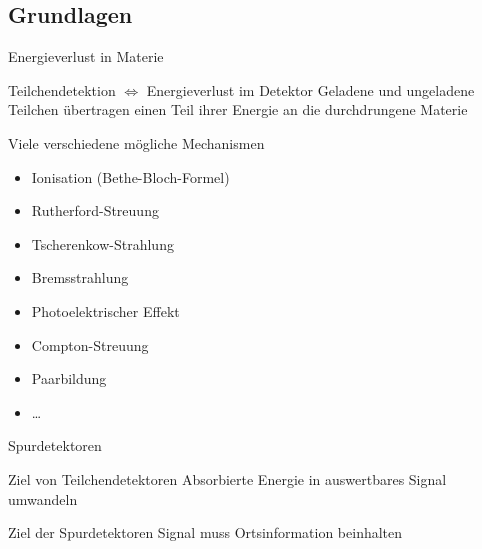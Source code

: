 
\subsection{Grundlagen}


\begin{frame}{Energieverlust in Materie}
	\begin{block}{Teilchendetektion $\Leftrightarrow$ Energieverlust im Detektor}
		Geladene und ungeladene Teilchen übertragen einen Teil ihrer Energie an die
		durchdrungene Materie	
	\end{block}
	
	
	\begin{block}{Viele verschiedene mögliche Mechanismen}
		\begin{itemize}
		  \item Ionisation (Bethe-Bloch-Formel)
		  \item Rutherford-Streuung
		  \item Tscherenkow-Strahlung
		  \item Bremsstrahlung
		  \item Photoelektrischer Effekt
		  \item Compton-Streuung
		  \item Paarbildung
		  \item \ldots
		\end{itemize}
	\end{block}
\end{frame}


\begin{frame}{Spurdetektoren}
	\begin{block}{Ziel von Teilchendetektoren}
		Absorbierte Energie in auswertbares Signal umwandeln 
	\end{block}
	
	\begin{exampleblock}{Ziel der Spurdetektoren}
		Signal muss Ortsinformation beinhalten
	\end{exampleblock}
\end{frame}

